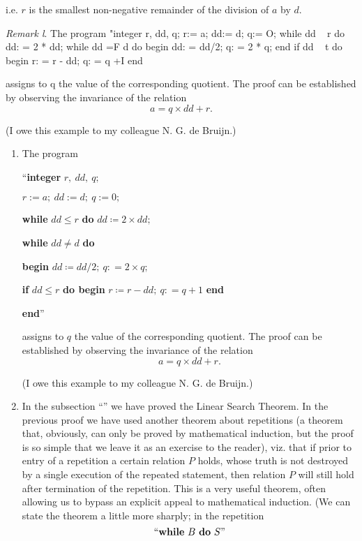 \noindent
i.e. $r$ is the smallest non-negative remainder of the division of $a$ by $d$.

\textit{Remark l}. The program
"integer r, dd, q;
r:= a; dd:= d; q:= O;
while dd ~ r do dd: = 2 * dd;
while dd =F d do
begin dd: = dd/2; q: = 2 * q;
end if dd ~ t do begin r: = r - dd; q: = q +I end

assigns to q the value of the corresponding quotient. The proof can be established by observing the invariance of the relation
$$
a= q \times dd + r.
$$

(I owe this example to my colleague N. G. de Bruijn.)

\begin{enumerate}[leftmargin=*, itemindent=3\parindent, label=\textit{Remark }\arabic*.]
	\item The program
	
	{
		\setlength{\parindent}{8em}
		\hspace{-.5em}``\textbf{integer} $r,\ dd,\ q;$
		
		$r:= a;\ dd:= d;\ q:= 0;$
		
		\textbf{while} $dd \leqslant r$ \textbf{do} $dd \coloneq 2 \times dd;$
		
		\textbf{while} $dd \neq d$ \textbf{do}
		
		\quad\textbf{begin} $dd \coloneq dd/2;\ q: = 2 \times q;$
		
		\quad\quad\textbf{if} $dd \leqslant r$ \textbf{do begin} $r \coloneq r - dd;\ q: = q + 1$ \textbf{end}
		
		\quad\textbf{end}''
	}
	
\noindent
assigns to $q$ the value of the corresponding quotient. The proof can be established by observing the invariance of the relation
	$$
	a= q \times dd + r.
	$$
	
	(I owe this example to my colleague N. G. de Bruijn.)

	\item In the subsection ``'' we have proved the Linear Search Theorem. In the previous proof we have used another theorem about repetitions (a theorem that, obviously, can only be proved by mathematical induction, but the proof is so simple that we leave it as an exercise to the reader), viz. that if prior to entry of a repetition a certain relation $P$ holds, whose truth is not destroyed by a single execution of the repeated statement, then relation $P$ will still hold after termination of the repetition. This is a very useful theorem, often allowing us to bypass an explicit appeal to mathematical induction. (We can state the theorem a little more sharply; in the repetition
	$$
		\text{``\textbf{while} } B \text{ \textbf{do} } S\text{''}
	$$	
	

\end{enumerate}
